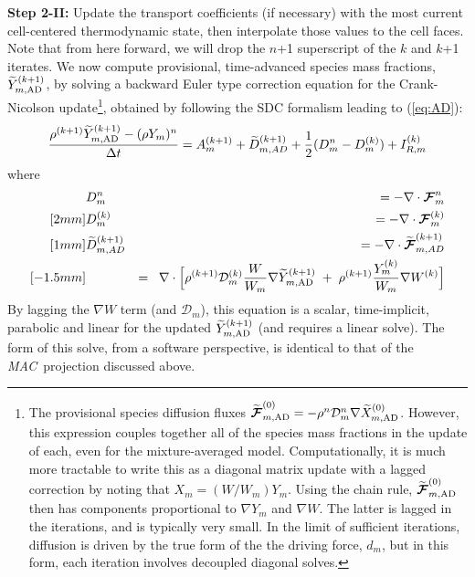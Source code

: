 {\bf Step 2-II:} Update the transport coefficients (if necessary) with the most current cell-centered thermodynamic
state, then interpolate those values to the cell faces.
Note that from here forward, we will drop the $n$+1 superscript of the $k$ and $k$+1 iterates.
We now compute provisional, time-advanced species mass fractions, $\widetilde Y_{m,{\rm AD}}^{(k+1)}$,
by solving a backward Euler type correction equation for the Crank-Nicolson update\footnote{The provisional species diffusion fluxes $\widetilde{\boldsymbol{\cal F}}_{m,{\rm AD}}^{(0)} = -\rho^n\mathcal D_m^n\nabla\widetilde X_{m,{\rm AD}}^{(0)}$. However, this expression couples together all of the species mass fractions in the update of each, even for the mixture-averaged model. Computationally, it is much more tractable to write this as a diagonal matrix update with a lagged correction by noting that $X_m = (W/W_m)Y_m$.  Using the chain rule, $\widetilde{\boldsymbol{\cal F}}_{m,{\rm AD}}^{(0)}$ then has components proportional to $\nabla Y_m$ and $\nabla W$. The latter is lagged in the iterations, and is typically very small. In the limit of sufficient iterations, diffusion is driven by the true form of the the driving force, $d_m$, but in this form, each iteration involves decoupled diagonal solves.\label{fn:X}}, obtained by following the SDC formalism leading to (\ref{eq:AD}):
\begin{equation}
  \frac{\rho^{(k+1)}\widetilde Y_{m,{\rm AD}}^{(k+1)} - (\rho Y_m)^n}{\Delta t}
  = A_m^{{(k+1)}} + \widetilde D_{m,AD}^{(k+1)} + \frac{1}{2}(D_m^n - D_m^{(k)}) + I_{R,m}^{(k)}
 \label{eq:pY}
\end{equation}
where
\begin{eqnarray*}
  &D_m^n &= - \nabla \cdot {\boldsymbol{\cal F}}_m^n\\ [2mm]
  &D_m^{(k)} &= - \nabla \cdot {\boldsymbol{\cal F}}_m^{(k)}\\ [1mm]
  &\widetilde D_{m,AD}^{(k+1)} &= - \nabla \cdot \widetilde {\boldsymbol{\cal F}}_{m,AD}^{(k+1)}\\ [-1.5mm]
  & &= \;\; \nabla \cdot \Big[ \rho^{(k+1)}\mathcal D_m^{(k)}\frac{W}{W_m}\nabla\widetilde Y_{m,{\rm AD}}^{(k+1)}
       \; + \; \rho^{(k+1)}\frac{Y_m^{(k)}}{W_m} \nabla W^{(k)} \Big]
\end{eqnarray*}
By lagging the $\nabla W$ term (and $\mathcal D_m$), this equation is a scalar, time-implicit, parabolic and linear for the updated $\widetilde Y_{m,{\rm AD}}^{(k+1)}$ (and requires a linear solve).  The form of this solve, from a
software perspective, is identical to that of the \textit{MAC}\ projection discussed above.

